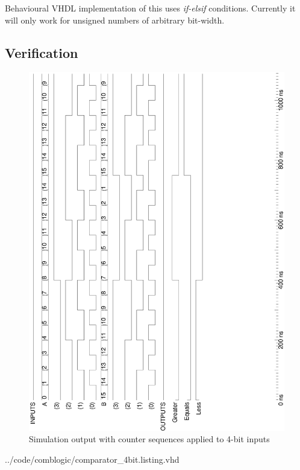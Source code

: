 \documentclass[10pt,a4paper]{report}
\begin{document}
 Behavioural VHDL implementation of this
 uses \emph{if-elsif} conditions. Currently
 it will only work for unsigned numbers
 of arbitrary bit-width.

\subsection{Verification}


 \begin{figure}[h!]
 \includegraphics[scale=0.37,angle=-90]{graphs/COMP4_simulation.ps}
 \caption{\small{Simulation output with counter sequences applied
 to 4-bit inputs}}
 \end{figure}


{../code/comblogic/comparator_4bit.listing.vhd}
\end{document}
